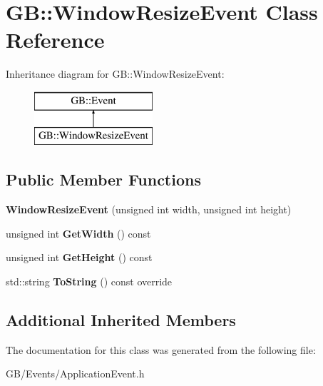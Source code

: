\hypertarget{class_g_b_1_1_window_resize_event}{}\section{GB\+::Window\+Resize\+Event Class Reference}
\label{class_g_b_1_1_window_resize_event}
Inheritance diagram for GB\+::Window\+Resize\+Event\+:\begin{figure}[H]
\begin{center}
\leavevmode
\includegraphics[height=2.000000cm]{class_g_b_1_1_window_resize_event}
\end{center}
\end{figure}
\subsection*{Public Member Functions}
\begin{DoxyCompactItemize}
\item 
\mbox{\label{class_g_b_1_1_window_resize_event_af0545acf278a808ab80a882733019212}} 
{\bfseries Window\+Resize\+Event} (unsigned int width, unsigned int height)
\item 
\mbox{\label{class_g_b_1_1_window_resize_event_a5ec8a7da50b051d1af381be8dcdda2b6}} 
unsigned int {\bfseries Get\+Width} () const
\item 
\mbox{\label{class_g_b_1_1_window_resize_event_a413fcb38690b0e039d6a98ca0238ef49}} 
unsigned int {\bfseries Get\+Height} () const
\item 
\mbox{\label{class_g_b_1_1_window_resize_event_ab3c49e461feba873ad03309529e34103}} 
std\+::string {\bfseries To\+String} () const override
\end{DoxyCompactItemize}
\subsection*{Additional Inherited Members}


The documentation for this class was generated from the following file\+:\begin{DoxyCompactItemize}
\item 
G\+B/\+Events/Application\+Event.\+h\end{DoxyCompactItemize}
